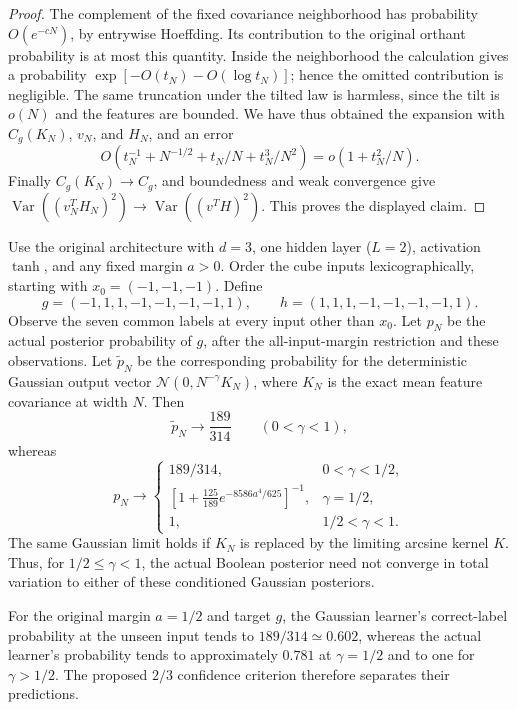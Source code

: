 \begin{proof}
The complement of the fixed covariance neighborhood has probability
$O(e^{-cN})$, by entrywise Hoeffding. Its contribution to the original
orthant probability is at most this quantity. Inside the neighborhood
the calculation gives a probability $\exp[-O(t_N)-O(\log t_N)]$;
hence the omitted contribution is negligible. The same truncation
under the tilted law is harmless, since the tilt is $o(N)$ and the
features are bounded. We have thus obtained the expansion with
$C_g(K_N)$, $v_N$, and $H_N$, and an error
\[
 O\left(t_N^{-1}+N^{-1/2}+t_N/N+t_N^3/N^2\right)
                  =o(1+t_N^2/N).
\]
Finally $C_g(K_N)\to C_g$, and boundedness and weak convergence give
$\operatorname{Var}((v_N^TH_N)^2)\to
\operatorname{Var}((v^TH)^2)$. This proves the displayed claim.
\end{proof}

\begin{theorem}
\label{thm:gaussian-posterior-counterexample}
Use the original architecture with $d=3$, one hidden layer ($L=2$),
activation $\tanh$, and any fixed margin $a>0$. Order the cube inputs
lexicographically, starting with $x_0=(-1,-1,-1)$. Define
\[
 g=(-1,1,1,-1,-1,-1,-1,1),\qquad
 h=(1,1,1,-1,-1,-1,-1,1).
\]
Observe the seven common labels at every input other than $x_0$.
Let $p_N$ be the actual posterior probability of $g$, after the
all-input-margin restriction and these observations. Let
$\widetilde p_N$ be the corresponding probability for the deterministic
Gaussian output vector $\mathcal N(0,N^{-\gamma}K_N)$, where $K_N$
is the exact mean feature covariance at width $N$. Then
\[
 \widetilde p_N\longrightarrow \frac{189}{314}
                  \qquad (0<\gamma<1),
\]
whereas
\[
 p_N\longrightarrow
 \begin{cases}
  189/314,&0<\gamma<1/2,\\[2pt]
  \displaystyle\left[1+\frac{125}{189}
              e^{-8586a^4/625}\right]^{-1},&\gamma=1/2,\\[6pt]
  1,&1/2<\gamma<1.
 \end{cases}
\]
The same Gaussian limit holds if $K_N$ is replaced by the limiting
arcsine kernel $K$. Thus, for $1/2\le\gamma<1$, the actual Boolean
posterior need not converge in total variation to either of these
conditioned Gaussian posteriors.

For the original margin $a=1/2$ and target $g$, the Gaussian learner's
correct-label probability at the unseen input tends to
$189/314\simeq0.602$, whereas the actual learner's probability tends
to approximately $0.781$ at $\gamma=1/2$ and to one for
$\gamma>1/2$. The proposed $2/3$ confidence criterion therefore
separates their predictions.
\end{theorem}

